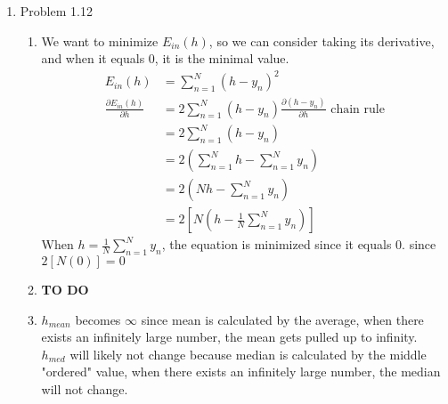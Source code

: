 \documentclass{article}
\begin{document}
\begin{enumerate}
        \item Problem 1.12
        \begin{enumerate}[label=(\alph*)]
            \item We want to minimize $E_{in}(h)$, so we can consider taking its derivative, and when it equals $0$, it is the minimal value.
            \begin{align*}
                E_{in}(h) &= \sum_{n = 1}^{N}(h - y_n)^2\\
                \frac{\partial E_{in}(h)}{\partial h} &= 2\sum_{n = 1}^{N}(h - y_n) \frac{\partial (h - y_n)}{\partial h} \text{ chain rule}\\
                &= 2\sum_{n = 1}^{N}(h - y_n)\\
                &= 2(\sum_{n = 1}^{N}h - \sum_{n = 1}^{N}y_n)\\
                &= 2(Nh - \sum_{n = 1}^{N}y_n)\\
                &= 2[N(h - \frac{1}{N}\sum_{n = 1}^{N}y_n)]
            \end{align*}
            When $h = \frac{1}{N}\sum_{n = 1}^{N}y_n$, the equation is minimized since it equals 0. since $2[N(0)] = 0$
            \item \textbf{TO DO}
            \item $h_{mean}$ becomes $\infty$ since mean is calculated by the average, when there exists an infinitely large number, the mean gets pulled up to infinity.\\[0.25in]
            $h_{med}$ will likely not change because median is calculated by the middle "ordered" value, when there exists an infinitely large number, the median will not change.
        \end{enumerate}
    \end{enumerate}
\end{document}
